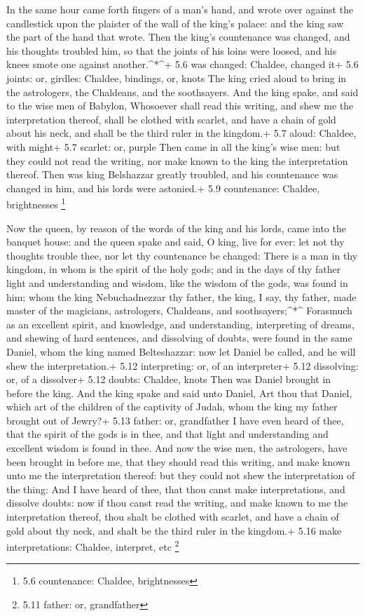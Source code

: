  In the same hour came forth fingers of a man's hand, and
wrote over against the candlestick upon the plaister of the wall of the
king's palace: and the king saw the part of the hand that wrote.
 Then the king's countenance was changed, and his thoughts
troubled him, so that the joints of his loins were loosed, and his knees
smote one against another.\^{}*\^{}+ 5.6 was changed: Chaldee, changed
it+ 5.6 joints: or, girdles: Chaldee, bindings, or, knots 
The king cried aloud to bring in the astrologers, the Chaldeans, and the
soothsayers. And the king spake, and said to the wise men of Babylon,
Whosoever shall read this writing, and shew me the interpretation
thereof, shall be clothed with scarlet, and have a chain of gold about
his neck, and shall be the third ruler in the kingdom.+ 5.7 aloud:
Chaldee, with might+ 5.7 scarlet: or, purple  Then came in
all the king's wise men: but they could not read the writing, nor make
known to the king the interpretation thereof.  Then was king
Belshazzar greatly troubled, and his countenance was changed in him, and
his lords were astonied.+ 5.9 countenance: Chaldee, brightnesses
\footnote{5.6 countenance: Chaldee, brightnesses}

 Now the queen, by reason of the words of the king and his
lords, came into the banquet house: and the queen spake and said, O
king, live for ever: let not thy thoughts trouble thee, nor let thy
countenance be changed:  There is a man in thy kingdom, in
whom is the spirit of the holy gods; and in the days of thy father light
and understanding and wisdom, like the wisdom of the gods, was found in
him; whom the king Nebuchadnezzar thy father, the king, I say, thy
father, made master of the magicians, astrologers, Chaldeans, and
soothsayers;\^{}*\^{}  Forasmuch as an excellent spirit,
and knowledge, and understanding, interpreting of dreams, and shewing of
hard sentences, and dissolving of doubts, were found in the same Daniel,
whom the king named Belteshazzar: now let Daniel be called, and he will
shew the interpretation.+ 5.12 interpreting: or, of an interpreter+ 5.12
dissolving: or, of a dissolver+ 5.12 doubts: Chaldee, knots
 Then was Daniel brought in before the king. And the king
spake and said unto Daniel, Art thou that Daniel, which art of the
children of the captivity of Judah, whom the king my father brought out
of Jewry?+ 5.13 father: or, grandfather  I have even heard
of thee, that the spirit of the gods is in thee, and that light and
understanding and excellent wisdom is found in thee.  And
now the wise men, the astrologers, have been brought in before me, that
they should read this writing, and make known unto me the interpretation
thereof: but they could not shew the interpretation of the thing:
 And I have heard of thee, that thou canst make
interpretations, and dissolve doubts: now if thou canst read the
writing, and make known to me the interpretation thereof, thou shalt be
clothed with scarlet, and have a chain of gold about thy neck, and shalt
be the third ruler in the kingdom.+ 5.16 make interpretations: Chaldee,
interpret, etc \footnote{5.11 father: or, grandfather}

